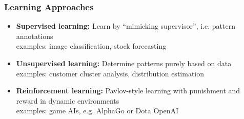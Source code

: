 \documentclass[aspectratio=1610]{beamer}
\begin{document}
\begin{frame}
\frametitle{Learning Approaches}
    \begin{itemize}
        \item \textbf{Supervised learning:} Learn by ``mimicking supervisor'', i.e. pattern annotations\\ 
        examples: image classification, stock forecasting
        \item \textbf{Unsupervised learning:} Determine patterns purely based on data\\ examples: customer cluster analysis, distribution estimation
        \item \textbf{Reinforcement learning:} Pavlov-style learning with punishment and reward in dynamic environments\\
        examples: game AIs, e.g. AlphaGo or Dota OpenAI
    \end{itemize}
\end{frame}
\end{document}
